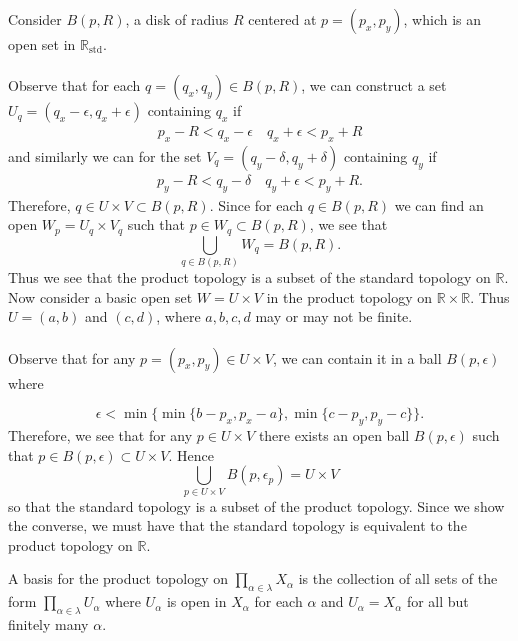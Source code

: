 \documentclass[a4paper,12pt,twoside]{hmcpset}
\begin{document}
\begin{solution}
Consider
$B(p, R)$, a disk of radius $R$ centered at $p = (p_x, p_y)$,
which is an open set in $\mathbb{R}_\text{std}$. 
\\
\\
Observe that for each $q = (q_x, q_y) \in B(p, R)$, we can construct a
set $U_q = (q_x - \epsilon, q_x + \epsilon)$
containing $q_x$ if 
\begin{gather*}
    p_x - R < q_x - \epsilon \quad q_x + \epsilon < p_x + R
\end{gather*}
and similarly we can for the set $V_q = (q_y - \delta, q_y + \delta)$ containing $q_y$ if
\begin{gather*}
    p_y - R < q_y - \delta \quad q_y + \epsilon < p_y + R.
\end{gather*} 
Therefore, $q \in U \times V \subset B(p, R)$. Since for each $q \in
B(p, R)$ we can find an open $W_p = U_q \times V_q$ such that $p \in
W_q \subset B(p, R)$, we see that 
\[
   \bigcup\limits_{q \in B(p, R)} W_q =  B(p, R).
\]
Thus we see that the product topology is a subset of the standard
topology on $\mathbb{R}$.
Now consider a basic open set $W = U \times V$ 
in the product topology on $\mathbb{R}\times \mathbb{R}$.
Thus $U =(a, b)$ and $(c, d)$, where $a, b, c, d$ may or may not be
finite.
\\
\\
Observe that for any $p = (p_x, p_y) \in U \times V$, we can contain
it in a ball $B(p, \epsilon)$ where 

\[
    \epsilon <\min\{\min\{b-p_x,p_x-a\}, \min\{c-p_y, p_y - c\}\}.
\]
Therefore, we see that for any $p \in U \times V$ there exists an open
ball $B(p, \epsilon)$ such that $p \in B(p, \epsilon) \subset U \times
V$. Hence 
\[
    \bigcup\limits_{p \in U \times V}B(p, \epsilon_p) = U \times V 
\]
so that the standard topology is a subset of the product topology. 
Since we show the converse, we must have that the standard topology is
equivalent to the product topology on $\mathbb{R}$.
\end{solution}

\begin{exercise}[Exercise 4.37]
    A basis for the product topology on $\prod\limits_{\alpha \in \lambda}
X_\alpha$ is the collection of all sets of the form
$\prod\limits_{\alpha \in \lambda}U_\alpha$ where $U_\alpha$ is open
in $X_\alpha$ for each $\alpha$ and $U_\alpha = X_\alpha$ for all but
finitely many $\alpha$.
\end{exercise}
\end{document}
